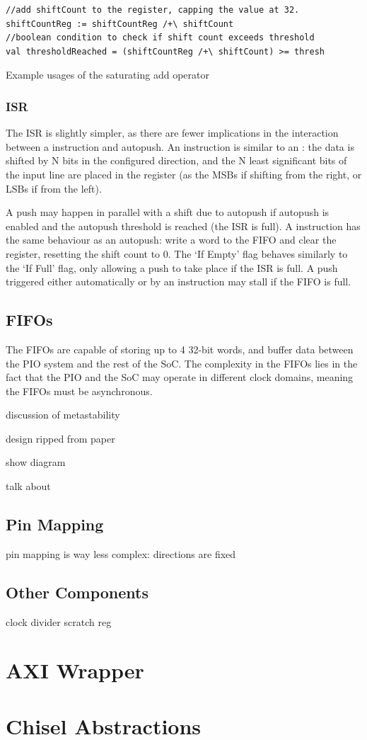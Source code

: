 \begin{listing}[h!]
    \vspace{0.5cm}
    \begin{verbatim}
//add shiftCount to the register, capping the value at 32.
shiftCountReg := shiftCountReg /+\ shiftCount
//boolean condition to check if shift count exceeds threshold
val thresholdReached = (shiftCountReg /+\ shiftCount) >= thresh
    \end{verbatim}
    \caption{Example usages of the saturating add operator}
    \label{lst:sat_add}
\end{listing}

\subsubsection{ISR}

The ISR is slightly simpler, as there are fewer implications in the interaction between a  instruction and autopush. An  instruction is similar to an : the data is shifted by N bits in the configured direction, and the N least significant bits of the input line are placed in the register (as the MSBs if shifting from the right, or LSBs if from the left).

A push may happen in parallel with a shift due to autopush if autopush is enabled and the autopush threshold is reached (the ISR is full). A  instruction has the same behaviour as an autopush: write a word to the FIFO and clear the register, resetting the shift count to 0. The `If Empty' flag behaves similarly to the `If Full' flag, only allowing a push to take place if the ISR is full. A push triggered either automatically or by an instruction may stall if the FIFO is full.

\subsection{FIFOs}

The FIFOs are capable of storing up to 4 32-bit words, and buffer data between the PIO system and the rest of the SoC. The complexity in the FIFOs lies in the fact that the PIO and the SoC may operate in different clock domains, meaning the FIFOs must be asynchronous.

discussion of metastability

design ripped from paper

show diagram

talk about


\subsection{Pin Mapping}
pin mapping is way less complex: directions are fixed
\subsection{Other Components}
clock divider
scratch reg
\section{AXI Wrapper}

\section{Chisel Abstractions}
